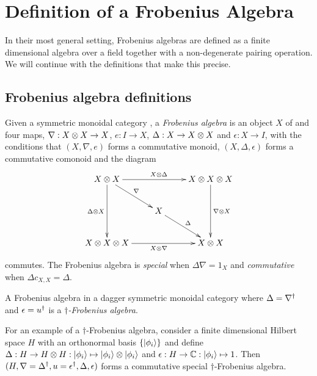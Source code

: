 \section{Definition of a Frobenius Algebra} %
\label{sec:definition_of_a_frobenius_algebra}
In their most general setting, Frobenius algebras are defined as a finite dimensional algebra
over a field together with a non-degenerate pairing operation. We will continue with the definitions
that make this precise.

\subsection{Frobenius algebra definitions} %
\label{sub:frobenius_algebra_definitions}


\begin{definition}\label{def:frobeniusalgebra}
  Given a symmetric monoidal category \cD, a \emph{Frobenius algebra} is an object $X$ of \cD and
  four maps, $\nabla :X\otimes X \to X$, $e: I \to X$, $\Delta: X\to X\otimes X$ and $\epsilon:X\to I$, with
  the conditions that $(X,\nabla,e)$ forms a commutative monoid, $(X,\Delta, \epsilon)$ forms a
  commutative comonoid and the diagram
  \[
    \xymatrix{
      X\*X \ar[rr]^{X\*\Delta} \ar[dd]_{\Delta \* X} \ar[dr]^{\nabla}
        && X\*X\*X \ar[dd]^{\nabla\*X}\\
      & X\ar[dr]^{\Delta}\\
      X\*X\*X\ar[rr]_{X\*\nabla}  && X\*X
    }
  \]
  commutes. The Frobenius algebra is \emph{special} when $\Delta \nabla = 1_{X}$ and
  \emph{commutative} when $\Delta c_{X,X} = \Delta$.
\end{definition}
\begin{definition}\label{def:daggerfrob}
  A Frobenius algebra in a dagger symmetric monoidal category where $\Delta = {\nabla}^{\dagger}$ and
  $\epsilon={u}^{\dagger}$ is a $\dagger$\emph{-Frobenius algebra}.
\end{definition}
For an example of a $\dagger$-Frobenius algebra, consider a finite dimensional Hilbert space $H$
with an orthonormal basis $\{\left\vert{\phi_{i}}\right\rangle\}$ and define $\Delta:H\to H\otimes H: \left\vert{\phi_{i}}\right\rangle\mapsto
\left\vert{\phi_{i}}\right\rangle \otimes \left\vert{\phi_{i}}\right\rangle$ and $\epsilon : H\to \mathbb{C} : \left\vert{\phi_{i}}\right\rangle \mapsto 1$. Then $(H,
\nabla={\Delta}^{\dagger}, u={\epsilon}^{\dagger}, \Delta, \epsilon)$ forms a commutative special
$\dagger$-Frobenius algebra.



